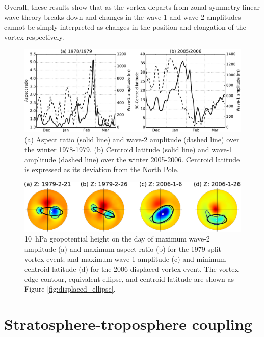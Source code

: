 Overall, these results show that as the vortex departs from zonal symmetry
linear wave theory breaks down and changes in the wave-1 and wave-2 amplitudes
cannot be simply interpreted as changes in the position and elongation of the
vortex respectively.


\begin{figure}
 \centering
 \noindent\includegraphics[width=\textwidth]{figures/chapter-moments/waves_moments_ts.pdf}
 \caption[Wave amplitude and moment diagnostic time series.]{(a) Aspect ratio
   (solid line) and wave-2 amplitude (dashed line) over the winter
   1978-1979. (b) Centroid latitude (solid line) and wave-1 amplitude (dashed
   line) over the winter 2005-2006. Centroid latitude is expressed as its
   deviation from the North Pole.}
 \label{fig:wave_moments_ts}
\end{figure}

\begin{figure}
 \centering
 \noindent\includegraphics[width=\textwidth]{figures/chapter-moments/wave_moment_vortices.pdf}
 \caption[Vortices at maximum of moment diagnostics and wave amplitudes.]{10~hPa
   geopotential height on the day of maximum wave-2 amplitude (a) and maximum
   aspect ratio (b) for the 1979 split vortex event; and maximum wave-1
   amplitude (c) and minimum centroid latitude (d) for the 2006 displaced vortex
   event. The vortex edge contour, equivalent ellipse, and centroid latitude are
   shown as Figure \ref{fig:displaced_ellipse}.}
 \label{fig:wave_moments_vortex}
\end{figure}


\section{Stratosphere-troposphere coupling}
\label{sec:moments_analysis}

